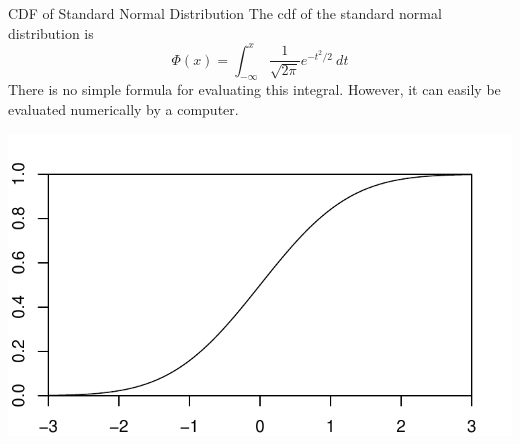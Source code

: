 \documentclass[handout]{beamer}
\begin{document}
\begin{frame}{CDF of Standard Normal Distribution}
The cdf of the standard normal distribution is
$$\Phi(x)=\int_{-\infty}^x \frac1{\sqrt{2\pi}}e^{-t^2/2}\ dt$$
There is no simple formula for evaluating this integral. However, it can easily be evaluated numerically by a computer.
\begin{center}
\includegraphics[scale=.5]{ch4_cdf_norm2.pdf}
\end{center}
\end{frame}
\end{document}
